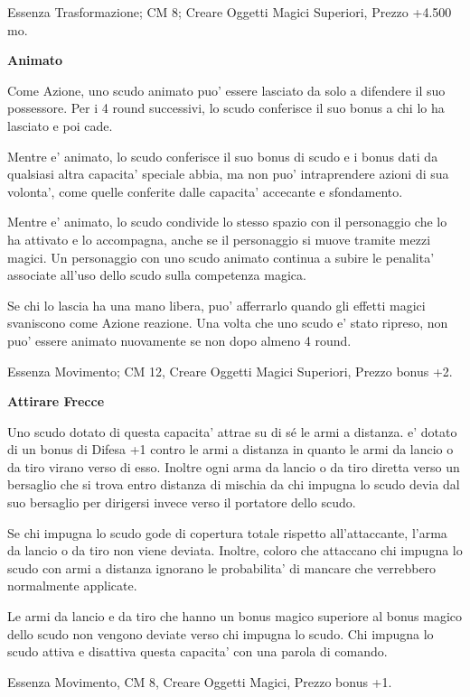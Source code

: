 \documentclass[a4paper,11pt,twoside,openany]{book}
\begin{document}
{		Essenza Trasformazione; CM 8; Creare Oggetti Magici Superiori, Prezzo
		+4.500 mo.
		
		\textbf{Animato}
		
		Come Azione, uno scudo animato puo' essere lasciato da solo a difendere il suo possessore. Per i 4 round successivi, lo scudo conferisce il suo bonus a chi lo ha lasciato e poi cade. 
		
		Mentre e' animato, lo scudo conferisce il suo bonus di scudo e i bonus dati da qualsiasi altra capacita' speciale abbia, ma non puo' intraprendere azioni di sua volonta', come quelle conferite dalle capacita' accecante e sfondamento. 
		
		Mentre e' animato, lo scudo condivide lo stesso spazio con il personaggio che lo ha attivato e lo accompagna, anche se il personaggio si muove tramite mezzi magici. Un personaggio con uno scudo animato continua a subire le penalita' associate all'uso dello scudo sulla competenza magica.
		
		Se chi lo lascia ha una mano libera, puo' afferrarlo quando gli effetti magici svaniscono come Azione reazione. Una volta che uno scudo e' stato ripreso, non puo' essere animato nuovamente se non dopo almeno 4 round.
		
		Essenza Movimento; CM 12, Creare Oggetti Magici Superiori, Prezzo bonus +2.
		
		\textbf{Attirare Frecce}
		
		Uno scudo dotato di questa capacita' attrae su di sé le armi a distanza. e' dotato di un bonus di Difesa +1 contro le armi a distanza in quanto le armi da lancio o da tiro virano verso di esso. Inoltre ogni arma da lancio o da tiro diretta verso un bersaglio che si trova entro distanza di mischia da chi impugna lo scudo devia dal suo bersaglio per dirigersi invece verso il portatore dello scudo.
		
		Se chi impugna lo scudo gode di copertura totale rispetto all'attaccante, l'arma da lancio o da tiro non viene deviata. Inoltre, coloro che attaccano chi impugna lo scudo con armi a distanza ignorano le probabilita' di mancare che verrebbero normalmente applicate.
		
		Le armi da lancio e da tiro che hanno un bonus magico superiore al bonus magico dello scudo non vengono deviate verso chi impugna lo scudo. Chi impugna lo scudo attiva e disattiva questa capacita' con una parola di comando.
		
		Essenza Movimento, CM 8, Creare Oggetti Magici, Prezzo bonus +1.
		
}
\end{document}
